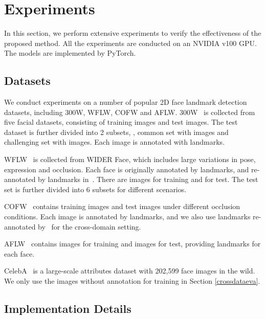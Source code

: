 \section{Experiments}
\label{sec:experiments}

In this section, we perform extensive experiments to verify the effectiveness of the proposed method. All the
experiments are conducted on an NVIDIA v100 GPU. The models are implemented by PyTorch.
\subsection{Datasets}

We conduct experiments on a number of popular 2D face landmark detection datasets, including 300W, WFLW, COFW and
AFLW. 300W~\cite{300W2013} is collected from five facial datasets, consisting of  training images and  test
images. The test dataset is further divided into 2 subsets, \ie, common set with  images and challenging set
with  images. Each image is annotated with  landmarks.

WFLW~\cite{LAB} is collected from WIDER Face, which includes large variations in pose, expression and occlusion. Each
face is originally annotated by  landmarks, and re-annotated by  landmarks in~\cite{PIPNet2021}. There are  images for training and  for test. The test set is
further divided into 6 subsets for different scenarios. 

COFW~\cite{COFW2013} contains  training images and  test images under different occlusion conditions. Each image is annotated by  landmarks, and we also use  landmarks re-annotated by~\cite{COFWReanno} for the cross-domain setting.

AFLW~\cite{AFLW2011} contains  images for training and  images for test, providing  landmarks for each face.

CelebA~\cite{celeba2015} is a large-scale attributes
dataset with 202,599 face images in the wild. We only use the images without annotation for training in Section \ref{crossdataeva}.






\subsection{Implementation Details}

